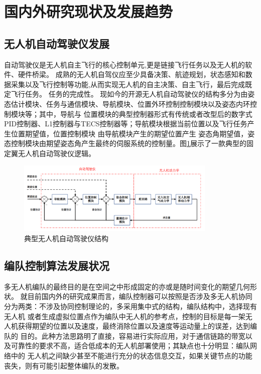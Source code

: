 \section{国内外研究现状及发展趋势}
\subsection{无人机自动驾驶仪发展}
自动驾驶仪是无人机自主飞行的核心控制单元,更是链接飞行任务以及无人机的软件、硬件桥梁。
成熟的无人机自驾仪应至少具备决策、航迹规划，状态感知和数据采集以及飞行控制等功能,从而实现无人机的自主决策、自主飞行，最后完成既定飞行任务。
任务的完成性。\cite{LiuLi2010}
现如今的开源无人机自动驾驶仪的结构多分为由姿态估计模块、任务与通信模块、导航模块、位置外环控制控制模块以及姿态内环控制模块等；其中，导航与
位置模块的典型控制器形式有传统或者改型后的数字式PID控制器、L1控制器\cite{Park_2004}与TECS控制器等\cite{Lambregts1983Vertical}；导航模块根据当前位置以及飞行任务产生位置期望值，位置控制模块
由导航模块产生的期望位置产生
姿态角期望值，姿态控制模块由期望姿态角产生最终的伺服系统的控制量。图\ref{fig-c1-autopilot}展示了一款典型的固定翼无人机自动驾驶仪逻辑。
\begin{figure}[H]
    \centering
    \includegraphics[width=0.85\textwidth]{figures/c1/autopilot_struct}
    \caption{典型无人机自动驾驶仪结构}\label{fig-c1-autopilot}
\end{figure}
\subsection{编队控制算法发展状况}
多无人机编队的最终目的是在空间之中形成固定的亦或是随时间变化的期望几何形状。
就目前国内外的研究成果而言，编队控制器可以按照是否涉及多无人机协同分为两类：不涉及协同控制理论的，多采用集中式的结构，编队结构中，选择现有无人机
或者生成虚拟位置点作为编队中无人机的参考点，控制的目标是每一架无人机获得期望的位置以及速度，最终消除位置以及速度等运动量上的误差，达到编队的
目的。此种方法思路明了直接，容易进行实际应用，对于通信链路的带宽以及可靠性的要求不高，适合低成本的无人机部署使用；其缺点也十分明显：编队网络中的
无人机之间缺少甚至不能进行充分的状态信息交互，如果关键节点的功能丧失，则有可能引起整体编队的发散。

